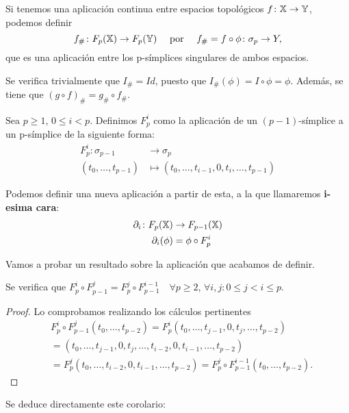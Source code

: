 Si tenemos una aplicación continua entre espacios topológicos $f \colon {\mathbb X} \to {\mathbb Y}$, podemos definir
\[f_{\#} \colon F_{p}({\mathbb X}) \to F_{p}({\mathbb Y})  \quad \text{ por }  \quad f_{\#} = f \circ \phi \colon \sigma_p \to Y, \]
que es una aplicación entre los p-símplices singulares de ambos espacios.

Se verifica trivialmente que $I_\# = Id$, puesto que $I_\#(\phi) = I \circ \phi = \phi$.
Además, se tiene que $(g \circ f)_\# = g_\# \circ f_\#$.

\begin{definition}
  Sea $p \geq 1$, $0 \leq i < p$. Definimos $F_p^i$ como la aplicación de un $(p-1)$-símplice a un p-símplice de la siguiente forma:
  \begin{align*}
    F_p^i \colon \sigma_{p-1} &\to \sigma_p\\
    (t_0, \dots, t_{p-1}) &\mapsto (t_0, \dots, t_{i-1}, 0, t_i, \dots, t_{p-1})
  \end{align*}

  Podemos definir una nueva aplicación a partir de esta, a la que llamaremos \textbf{i-esima cara}:
  \begin{align*}
    \partial_i \colon F_{p}({\mathbb X}) &\to F_{p-1}({\mathbb X})\\
    \partial_i(\phi) &= \phi \circ F_p^i
  \end{align*}
\end{definition}

Vamos a probar un resultado sobre la aplicación que acabamos de definir.

\begin{lemma}
  Se verifica que $F_p^i \circ F_{p-1}^j = F_p^j \circ F_{p-1}^{i-1} \quad \forall p \geq 2$, $\forall i, j \colon 0 \leq j < i \leq p$.
\end{lemma}

\begin{proof}
Lo comprobamos realizando los cálculos pertinentes
  \begin{align*}
    &F_p^i \circ F_{p-1}^j (t_0, \dots, t_{p-2}) = F_p^i (t_0, \dots, t_{j-1}, 0, t_j, \dots, t_{p-2}) \\
    &= (t_0, \dots, t_{j-1}, 0, t_j, \dots, t_{i-2}, 0, t_{i-1}, \dots, t_{p-2}) \\
    &= F_p^j (t_0, \dots, t_{i-2}, 0, t_{i-1}, \dots, t_{p-2}) = F_p^j \circ F_{p-1}^{i-1} (t_0, \dots, t_{p-2}).
  \end{align*}
\end{proof}

Se deduce directamente este corolario:

